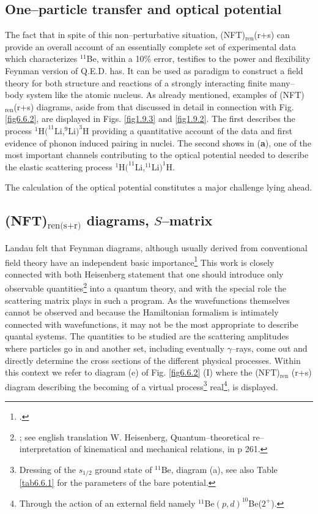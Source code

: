 \subsection{One--particle transfer and optical potential}
The fact that in spite of this non--perturbative situation, (NFT)$_{\text{ren}}$(r+s) can provide an overall account of an essentially complete set of experimental data which characterizes $^{11}$Be, within a 10\% error, testifies to the power and flexibility Feynman version of Q.E.D. has. It can be used as paradigm to construct a field theory for both structure and reactions of a strongly interacting finite many--body system like the atomic nucleus. As already mentioned, examples of (NFT)$_{\text{ren}}$(r+s) diagrams, aside from that discussed in detail in connection with Fig. \ref{fig6.6.2}, are displayed in Figs. \ref{fig1.9.3} and \ref{fig1.9.2}. The first describes the process  $^1$H$(^{11}$Li,$^9$Li$)^3$H providing a quantitative account of the data and first evidence of phonon induced pairing in nuclei. The second shows in (\textbf{a}), one of the most important channels contributing to the optical potential needed to describe the elastic scattering process $^1$H$(^{11}$Li,$^{11}$Li$)^1$H. 
    	    	 
The calculation of the optical potential constitutes a major challenge lying ahead.
\subsection{(NFT)$_{\text{ren(s+r)}}$ diagrams, $S$--matrix}\label{S6.6.2}
Landau felt that Feynman diagrams, although usually derived from conventional field theory have an independent basic importance\footnote{\cite{Landau:59}.} This work is closely connected with both Heisenberg statement that one should introduce only observable quantities\footnote{\cite{Heisenberg:25}; see english translation W. Heisenberg, Quantum--theoretical re--interpretation of kinematical and mechanical relations, in \cite{VanderWaerden:67} p 261.} into a quantum theory, and with the special role the scattering matrix plays in such a program. As the wavefunctions themselves cannot be observed and because the Hamiltonian formalism is intimately connected with wavefunctions, it may not be the most appropriate to describe quantal systems. The quantities to be studied are the scattering amplitudes where particles go in and another set, including eventually $\gamma$--rays, come out and directly determine the cross sections of the different physical processes.
Within this context we refer to diagram (e) of Fig. \ref{fig6.6.2} (I) where the (NFT)$_{\text{ren}}$ (r+s) diagram describing the becoming of a virtual process\footnote{Dressing of the $s_{1/2}$ ground state of $^{11}$Be, diagram (a), see also Table \ref{tab6.6.1} for the parameters of the bare potential.} real\footnote{Through the action of an external field namely $^{11}$Be$(p,d)^{10}$Be($2^+$).},  is displayed.  
 



